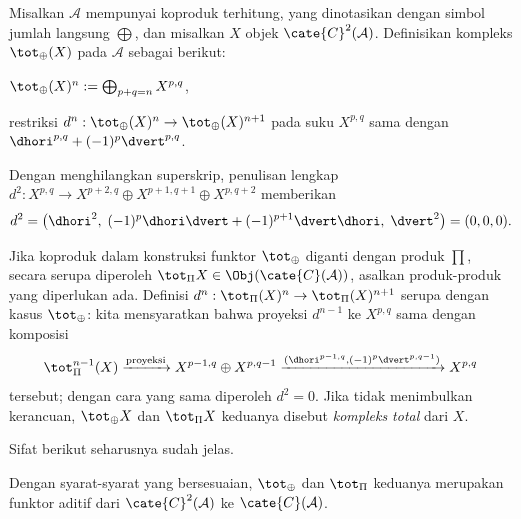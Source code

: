 \begin{definisi}\label{def:total-cplx}
	Misalkan $\mathcal{A}$ mempunyai koproduk terhitung, yang dinotasikan
	dengan simbol jumlah langsung $\bigoplus$, dan misalkan $X$ objek
	$\cate{C}^2(\mathcal{A})$. Definisikan kompleks $\tot_{\oplus}(X)$ pada
	$\mathcal{A}$ sebagai berikut:
	\begin{compactitem}
		\item $\tot_{\oplus}(X)^n := \bigoplus_{p+q=n} X^{p, q}$,
		\item restriksi $d^n:\tot_{\oplus}(X)^n\to
		\tot_{\oplus}(X)^{n+1}$ pada suku $X^{p,q}$ sama dengan
		$\dhori^{p,q}+(-1)^p\dvert^{p,q}$.
	\end{compactitem}
\end{definisi}

Dengan menghilangkan superskrip, penulisan lengkap
$d^2:X^{p,q}\to X^{p+2,q}\oplus X^{p+1,q+1}\oplus X^{p,q+2}$ memberikan
\[ d^2 = \left( \dhori^2, \; (-1)^p \dhori \dvert + (-1)^{p+1} \dvert \dhori , \; \dvert^2 \right) = (0, 0, 0). \]

Jika koproduk dalam konstruksi funktor $\tot_{\oplus}$ diganti dengan produk
$\prod$, secara serupa diperoleh
$\tot_{\Pi}X\in\Obj(\cate{C}(\mathcal{A}))$, asalkan produk-produk yang
diperlukan ada. Definisi
$d^n:\tot_{\Pi}(X)^n\to\tot_{\Pi}(X)^{n+1}$ serupa dengan kasus
$\tot_{\oplus}$: kita mensyaratkan bahwa proyeksi $d^{n-1}$ ke $X^{p,q}$
sama dengan komposisi
\[ \tot_{\Pi}^{n-1}(X) \xrightarrow{\text{proyeksi}} X^{p-1, q} \oplus X^{p,q-1} \xrightarrow{(\dhori^{p-1, q}, (-1)^p \dvert^{p, q-1})} X^{p, q} \]
tersebut; dengan cara yang sama diperoleh $d^2=0$. Jika tidak menimbulkan
kerancuan, $\tot_{\oplus}X$ dan $\tot_{\Pi}X$ keduanya disebut
\emph{kompleks total} dari $X$.

Sifat berikut seharusnya sudah jelas.

\begin{proposisi}
	Dengan syarat-syarat yang bersesuaian, $\tot_{\oplus}$ dan $\tot_{\Pi}$
	keduanya merupakan funktor aditif dari $\cate{C}^2(\mathcal{A})$ ke
	$\cate{C}(\mathcal{A})$.
\end{proposisi}


